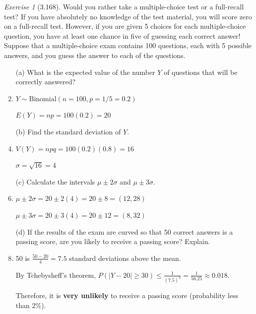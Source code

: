 \documentclass[12pt]{amsart}
\makeatletter
\theoremstyle{remark}
\newtheorem*{exercise}{Exercise}%
\renewenvironment{proof}[1][\proofname]{\par\doublespacing
  \pushQED{\qed}%
  \normalfont \topsep6\p@\@plus6\p@\relax
  \list{}{%
    \settowidth{\leftmargin}{\itshape\proofname:\hskip\labelsep}%
    \setlength{\labelwidth}{0pt}%
    \setlength{\itemindent}{-\leftmargin}%
  }%
  \item[\hskip\labelsep\itshape#1\@addpunct{:}]\ignorespaces
}{%
  \popQED\endlist\@endpefalse
  \singlespacing
}
\theoremstyle{mycomment}
\makeatother
\begin{document}
\begin{exercise}[3.168]
Would you rather take a multiple-choice test or a full-recall test? If you have absolutely no knowledge of the test material, you will score zero on a full-recall test. However, if you are given 5 choices for each multiple-choice question, you have at least one chance in five of guessing each correct answer! Suppose that a multiple-choice exam contains 100 questions, each with 5 possible answers, and you guess the answer to each of the questions.

\begin{enumerate}
    \item[(a)] What is the expected value of the number $Y$ of questions that will be correctly answered?
\begin{proof}[Solution]
 $Y \sim \text{Binomial}(n = 100, p = 1/5 = 0.2)$
	
	$E(Y) = np = 100(0.2) = 20$
\end{proof}
    \item[(b)] Find the standard deviation of $Y$.
\begin{proof}[Solution]
 $V(Y) = npq = 100(0.2)(0.8) = 16$
	
	$\sigma = \sqrt{16} = 4$
\end{proof}
    \item[(c)] Calculate the intervals $\mu \pm 2\sigma$ and $\mu \pm 3\sigma$.
\begin{proof}[Solution]
 $\mu \pm 2\sigma = 20 \pm 2(4) = 20 \pm 8 = (12, 28)$
	
	$\mu \pm 3\sigma = 20 \pm 3(4) = 20 \pm 12 = (8, 32)$
\end{proof}
    \item[(d)] If the results of the exam are curved so that 50 correct answers is a passing score, are you likely to receive a passing score? Explain.
\begin{proof}[Solution]
 50 is $\frac{50 - 20}{4} = 7.5$ standard deviations above the mean.
	
	By Tchebysheff's theorem, $P(|Y - 20| \geq 30) \leq \frac{1}{(7.5)^2} = \frac{1}{56.25} \approx 0.018$.
	
	Therefore, it is \textbf{very unlikely} to receive a passing score (probability less than 2\%).
\end{proof}
\end{enumerate} 
\end{exercise}
\end{document}
